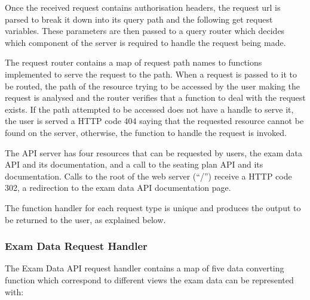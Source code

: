 Once the received request contains authorisation headers, the request url is parsed to break it down into its query path and the following get request variables.  These parameters are then passed to a query router which decides which component of the server is required to handle the request being made.

The request router contains a map of request path names to functions implemented to serve the request to the path.  When a request is passed to it to be routed, the path of the resource trying to be accessed by the user making the request is analysed and the router verifies that a function to deal with the request exists.  If the path attempted to be accessed does not have a handle to serve it, the user is served a HTTP code 404 saying that the requested resource cannot be found on the server, otherwise, the function to handle the request is invoked.

The API server has four resources that can be requested by users, the exam data API and its documentation, and a call to the seating plan API and its documentation.  Calls to the root of the web server (``/'') receive a HTTP code 302, a redirection to the exam data API documentation page.

The function handler for each request type is unique and produces the output to be returned to the user, as explained below.

\subsubsection{Exam Data Request Handler}

\label{subsec:exam_data_handler}

The Exam Data API request handler contains a map of five data converting function which correspond to different views the exam data can be represented with:

